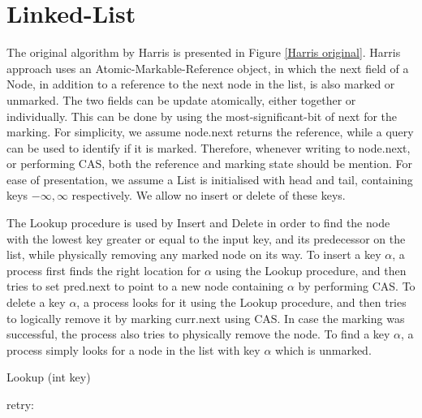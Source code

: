 \section{Linked-List}

\DontPrintSemicolon
{}

The original algorithm by Harris is presented in Figure \ref{Harris original}. Harris approach uses an Atomic-Markable-Reference object, in which the next field of a Node, in addition to a reference to the next node in the list, is also marked or unmarked. The two fields can be update atomically, either together or individually. This can be done by using the most-significant-bit of next for the marking. For simplicity, we assume node.next returns the reference, while a query can be used to identify if it is marked. Therefore, whenever writing to node.next, or performing CAS, both the reference and marking state should be mention.
For ease of presentation, we assume a List is initialised with head and tail, containing keys $-\infty, \infty$ respectively. We allow no insert or delete of these keys.

The Lookup procedure is used by Insert and Delete in order to find the node with the lowest key greater or equal to the input key, and its predecessor on the list, while physically removing any marked node on its way. To insert a key $\alpha$, a process first finds the right location for $\alpha$ using the Lookup procedure, and then tries to set pred.next to point to a new node containing $\alpha$ by performing CAS. To delete a key $\alpha$, a process looks for it using the Lookup procedure, and then tries to logically remove it by marking curr.next using CAS. In case the marking was successful, the process also tries to physically remove the node. To find a key $\alpha$, a process simply looks for a node in the list with key $\alpha$ which is unmarked.



\begin{procedure}[H]
	\caption{Lookup (int key)}
	
		
	retry: 
		
\end{procedure}



